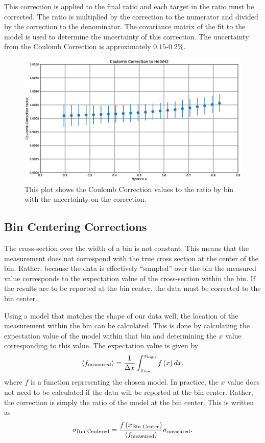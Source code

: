 This correction is applied to the final ratio and each target in the ratio must be corrected. The ratio is multiplied by the correction to the numerator and divided by the correction to the denominator. The covariance matrix of the fit to the model is used to determine the uncertainty of this correction. The uncertainty from the Coulomb Correction is approximately $0.15$-$0.2\%$.

\begin{figure}
	\includegraphics[width=\textwidth]{./analysis/fig/cc.eps}
	\caption{This plot shows the Coulomb Correction values to the  ratio by bin with the uncertainty on the correction.}
\end{figure}

\subsection{Bin Centering Corrections}

The cross-section over the width of a bin is not constant. This means that the measurement does not correspond with the true cross section at the center of the bin. Rather, because the data is effectively ``sampled'' over the bin the measured value corresponds to the expectation value of the cross-section within the bin. If the results are to be reported at the bin center, the data must be corrected to the bin center.

Using a model that matches the shape of our data well, the location of the measurement within the bin can be calculated. This is done by calculating the expectation value of the model within that bin and determining the $x$ value corresponding to this value. The expectation value is given by
\begin{equation}
	\langle f_{\rm measured}\rangle = \frac{1}{\Delta x}\int_{x_{\rm low}}^{x_{\rm high}} f\left( x \right) dx,
\end{equation}
where $f$ is a function representing the chosen model. In practice, the $x$ value does not need to be calculated if the data will be reported at the bin center. Rather, the correction is simply the ratio of the model at the bin center. This is written as
\begin{equation}
	\sigma_{\textrm{Bin Centered}} = \frac{f\left(x_{\textrm{Bin Center}}\right)}{\langle f_{\rm measured}\rangle} \sigma_{\rm measured}.
\end{equation}

